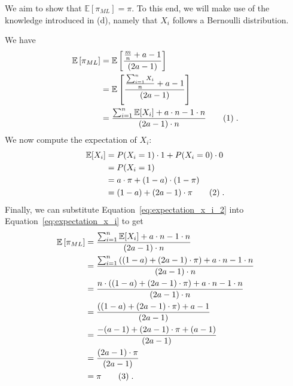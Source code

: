 \documentclass{article}
\newcommand{\stepandtag}{%
  \refstepcounter{equation}%
  \tag{\theequation}%
}
\newcommand{\piml}{\ensuremath{\pi_{ML}}}
\begin{document}
We aim to show that $\mathbb{E}[\piml] = \pi$.
To this end, we will make use of the knowledge introduced in (d), namely that $X_i$ follows a Bernoulli distribution.

We have 
\begin{align*}
    \mathbb{E} \left[ \pi_{ML} \right] &= \mathbb{E} \left[ \frac{\frac{m}{n} + a - 1}{(2a -1)} \right] \\
    &= \mathbb{E} \left[ \frac{\frac{\sum_{i=1}^{n} X_i}{n} + a - 1}{(2a -1)} \right] \\
    &= \frac{\sum_{i=1}^{n} \mathbb{E}[ X_i] + a \cdot n - 1 \cdot n}{(2a -1) \cdot n} \stepandtag \label{eq:expectation_x_i}\;.
\end{align*}
We now compute the expectation of $X_i$:
\begin{align*}
    \mathbb{E}[X_i] &= P(X_i=1) \cdot 1 + P(X_i = 0) \cdot 0 \\
    &= P(X_i=1) \\
    &= a \cdot \pi + (1-a) \cdot (1-\pi) \\
    &= (1-a) + (2a - 1) \cdot \pi \stepandtag \label{eq:expectation_x_i_2} \;.
\end{align*}
Finally, we can substitute Equation~\ref{eq:expectation_x_i_2} into Equation~\ref{eq:expectation_x_i} to get
\begin{align*}
    \mathbb{E} \left[ \pi_{ML} \right] &= \frac{\sum_{i=1}^{n} \mathbb{E}[ X_i] + a \cdot n - 1 \cdot n}{(2a -1) \cdot n} \\
    &= \frac{\sum_{i=1}^{n} \left( (1-a) + (2a - 1) \cdot \pi \right) + a \cdot n - 1 \cdot n}{(2a -1) \cdot n} \\
    &= \frac{ n \cdot \left( (1-a) + (2a - 1) \cdot \pi \right) + a \cdot n - 1 \cdot n}{(2a -1) \cdot n} \\
    &= \frac{ \left( (1-a) + (2a - 1) \cdot \pi \right) + a - 1}{(2a -1)} \\
    &= \frac{ -(a-1) + (2a - 1) \cdot \pi + (a - 1)}{(2a -1)} \\
    &= \frac{ (2a - 1) \cdot \pi}{(2a -1)} \\
    &= \pi \stepandtag \label{eq:expectation_pi_ml}\;.
\end{align*}
\end{document}
